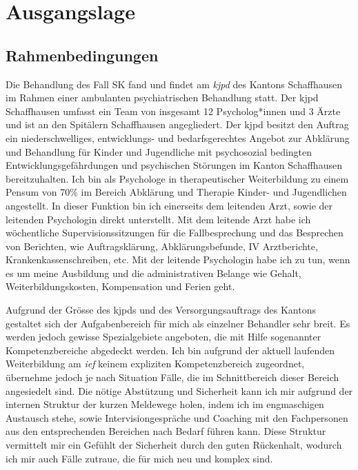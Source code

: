 \section{Ausgangslage} \label{Ausgangslage}
\subsection{Rahmenbedingungen}
Die Behandlung des Fall SK fand und findet am \textit{\ac{kjpd}} des Kantons Schaffhausen im Rahmen einer ambulanten psychiatrischen Behandlung statt. Der \ac{kjpd} Schaffhausen umfasst ein Team von insgesamt 12 Psycholog*innen und 3 Ärzte und ist an den Spitälern Schaffhausen angegliedert. Der \ac{kjpd} besitzt den Auftrag ein niederschwelliges, entwicklungs- und bedarfsgerechtes Angebot zur Abklärung und Behandlung für Kinder und Jugendliche mit psychosozial bedingten Entwicklungsgefährdungen und psychischen Störungen im Kanton Schaffhausen bereitzuhalten. Ich bin als Psychologe in therapeutischer Weiterbildung zu einem Pensum von 70\% im Bereich Abklärung und Therapie Kinder- und Jugendlichen angestellt. In dieser Funktion bin ich einerseits dem leitenden Arzt, sowie der leitenden Psychologin direkt unterstellt. Mit dem leitende Arzt habe ich wöchentliche Supervisionssitzungen für die Fallbesprechung und das Besprechen von Berichten, wie Auftragsklärung,  Abklärungsbefunde, IV Arztberichte, Krankenkassenschreiben, etc. Mit der leitende Psychologin habe ich zu tun, wenn es um meine Ausbildung und die administrativen Belange wie Gehalt, Weiterbildungskosten, Kompensation und Ferien geht.  

Aufgrund der Grösse des \ac{kjpd}s und des Versorgungsauftrags des Kantons gestaltet sich der Aufgabenbereich für mich als einzelner Behandler sehr breit. Es werden jedoch gewisse Spezialgebiete angeboten, die mit Hilfe sogenannter Kompetenzbereiche abgedeckt werden. Ich bin aufgrund der aktuell laufenden Weiterbildung am \textit{\ac{ief}} keinem expliziten Kompetenzbereich zugeordnet, übernehme jedoch je nach Situation Fälle, die im Schnittbereich dieser Bereich angesiedelt sind. Die nötige Abstützung und Sicherheit kann ich mir aufgrund der internen Struktur der kurzen Meldewege holen, indem ich im engmaschigen Austausch stehe, sowie Intervisiongespräche und Coaching mit den Fachpersonen aus den entsprechenden Bereichen nach Bedarf führen kann. Diese Struktur vermittelt mir ein Gefühlt der Sicherheit durch den guten Rückenhalt, wodurch ich mir auch Fälle zutraue, die für mich neu und komplex sind.

